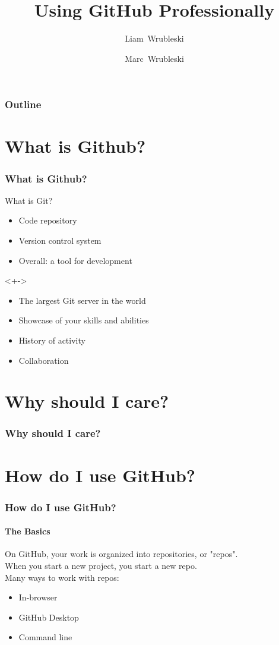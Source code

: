 \documentclass{beamer}
\title[]{Using GitHub Professionally}
\author[]{Liam~Wrubleski\inst{1} \and Marc~Wrubleski\inst{2}}
\institute{
\inst{1}%
BSc. Electrical Engineering, BSc. Mathematics
\and
\inst{2}%
Technical Manager at the Schulich School of Engineering %
}
\begin{document}
\begin{frame}[plain]
  \maketitle
\end{frame}

\begin{frame}
  \frametitle{Outline}
  \tableofcontents
\end{frame}

\section{What is Github?}
\begin{frame}
  \frametitle{What is Github?}
  What is Git?\pause
  \begin{itemize}[<+->]
    \item Code repository
    \item Version control system
    \item Overall: a tool for development
  \end{itemize}

  <+->
  \begin{itemize}[<+->]
    \item The largest Git server in the world
    \item Showcase of your skills and abilities
    \item History of activity
    \item Collaboration %
  \end{itemize}
\end{frame}

\section{Why should I care?}
\begin{frame}
  \frametitle{Why should I care?}
\end{frame}

\section{How do I use GitHub?} %
\begin{frame}
  \frametitle{How do I use GitHub?}
  \framesubtitle{The Basics}
  On GitHub, your work is organized into repositories, or "repos".\\\pause
  When you start a new project, you start a new repo.\\\pause
  Many ways to work with repos:\pause
  \begin{itemize}[<+->]
    \item In-browser
    \item GitHub Desktop
    \item Command line
  \end{itemize}
\end{frame}
\end{document}
